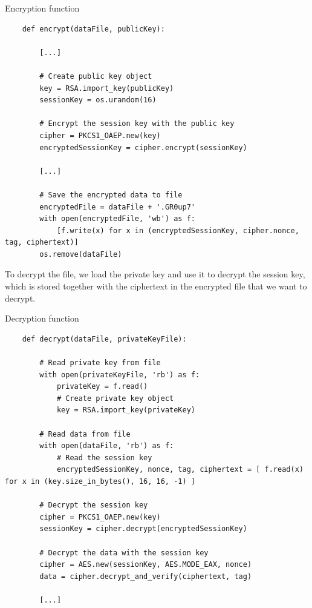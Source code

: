 \begin{codesnippet}[H]
    \caption{Encryption function}
    \label{code:encryption_function}
\end{codesnippet}
\vspace{-0.75cm}
\begin{lstlisting}
    def encrypt(dataFile, publicKey):

        [...]

        # Create public key object
        key = RSA.import_key(publicKey)
        sessionKey = os.urandom(16)

        # Encrypt the session key with the public key
        cipher = PKCS1_OAEP.new(key)
        encryptedSessionKey = cipher.encrypt(sessionKey)

        [...]

        # Save the encrypted data to file
        encryptedFile = dataFile + '.GR0up7'
        with open(encryptedFile, 'wb') as f:
            [f.write(x) for x in (encryptedSessionKey, cipher.nonce, tag, ciphertext)]
        os.remove(dataFile)
\end{lstlisting}

To decrypt the file, we load the private key and use it to decrypt the session key, which is stored together with the ciphertext in the encrypted file that we want to decrypt.

\begin{codesnippet}[H]
    \caption{Decryption function}
    \label{code:decryption_function}
\end{codesnippet}
\vspace{-0.75cm}
\begin{lstlisting}
    def decrypt(dataFile, privateKeyFile):

        # Read private key from file
        with open(privateKeyFile, 'rb') as f:
            privateKey = f.read()
            # Create private key object
            key = RSA.import_key(privateKey)

        # Read data from file
        with open(dataFile, 'rb') as f:
            # Read the session key
            encryptedSessionKey, nonce, tag, ciphertext = [ f.read(x) for x in (key.size_in_bytes(), 16, 16, -1) ]

        # Decrypt the session key
        cipher = PKCS1_OAEP.new(key)
        sessionKey = cipher.decrypt(encryptedSessionKey)

        # Decrypt the data with the session key
        cipher = AES.new(sessionKey, AES.MODE_EAX, nonce)
        data = cipher.decrypt_and_verify(ciphertext, tag)

        [...]
\end{lstlisting}

